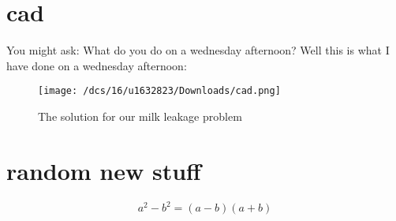 \documentclass[12pt,a4paper,twocolumn]{article}
\begin{document}
\section{cad}
You might ask: What do you do on a wednesday afternoon?
Well this is what I have done on a wednesday afternoon:
\begin{figure}[h]
	\texttt{[image: /dcs/16/u1632823/Downloads/cad.png]}
	\caption{The solution for our milk leakage problem}
	\label{reflabel}
\end{figure}
\section{random new stuff}
\begin{equation}
	a^{2} - b^{2} = (a-b)(a+b)
	\label{diff2squares}
\end{equation}
\end{document}

